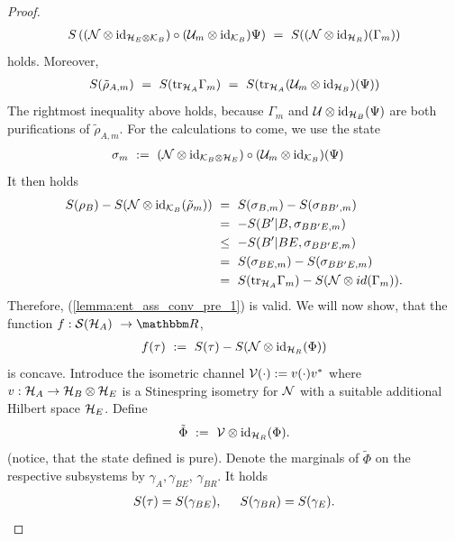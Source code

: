 \begin{proof}
 \begin{align*}
 S\left(({\mathcal N} \otimes \mathrm{id}_{{\mathcal H}_E \otimes {\mathcal K}_B})\circ({\mathcal U}_m \otimes \mathrm{id}_{{\mathcal K}_B})\Psi \right)
 \ = \ S(({\mathcal N} \otimes \mathrm{id}_{{\mathcal H}_R})(\Gamma_m))
 \end{align*}
 holds. Moreover, 
 \begin{align*}
 S(\tilde{\rho}_{A,m}) \ = \ S(\mathrm{tr}_{{\mathcal H}_A}\Gamma_m) \ = \ S(\mathrm{tr}_{{\mathcal H}_A}({\mathcal U}_m \otimes \mathrm{id}_{{\mathcal H}_B})(\Psi))
 \end{align*}
 The rightmost inequality above holds, because $\Gamma_m$ and ${\mathcal U} \otimes \mathrm{id}_{{\mathcal H}_B}(\Psi)$ are both purifications of $\tilde{\rho}_{A,m}$. For the calculations to come, we use the state 
 \begin{align*}
	\sigma_{m} \ 
	&:= \ (\cN \otimes \id_{\cK_B \otimes \cH_E})\circ (\cU_m \otimes \id_{\cK_B})(\Psi)
 \end{align*}
  It then holds
  \begin{align*}
  S(\rho_B) - S(\cN \otimes \id_{\cK_B}(\tilde{\rho}_m)) \ 
  &= \ S(\sigma_{B,m}) - S(\sigma_{BB',m}) \\
  &= \ -S(B'|B, \sigma_{BB'E,m}) \\
  &\leq \ -S(B'|BE, \sigma_{BB'E,m}) \\ 
  &= \ S(\sigma_{BE,m}) - S(\sigma_{BB'E,m}) \\
  &= \ S(\tr_{\cH_A} \Gamma_m) - S(\cN \otimes id(\Gamma_m)). 
  \end{align*}
  Therefore, (\ref{lemma:ent_ass_conv_pre_1}) is valid. We will now show, that the function
  $f: \cS(\cH_A) \ \rightarrow \bbmR$,
  \begin{align*}
    f(\tau) \ := \ S(\tau) - S({\mathcal N} \otimes \mathrm{id}_{{\mathcal H}_R}(\Phi))
  \end{align*}
   is concave. Introduce the isometric channel ${\mathcal V}(\cdot) := v(\cdot)v^\ast$ where 
   $v: {\mathcal H}_A \rightarrow {\mathcal H}_B \otimes {\mathcal H}_E$ is a Stinespring isometry for ${\mathcal N}$ with a 
   suitable additional Hilbert space ${\mathcal H}_E$. Define
   \begin{align*}
	\tilde{\Phi} \ := \ {\mathcal V} \otimes \mathrm{id}_{{\mathcal H}_R}(\Phi).
   \end{align*}
   (notice, that the state defined is pure). Denote the marginals of $\tilde{\Phi}$ on the respective subsystems by
   $\gamma_A, \gamma_{BE}$, $\gamma_{BR}$. It holds
   \begin{align*}
   S(\tau) = S(\gamma_{BE}), \hspace{.5cm} S(\gamma_{BR}) = S(\gamma_E). 

\end{align*}
\end{proof}
